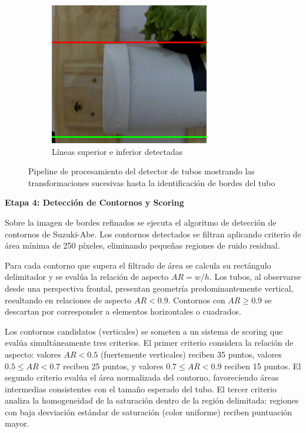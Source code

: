 \begin{figure}[H]
\vspace{0.3cm}

\begin{subfigure}[b]{0.48\textwidth}
    \centering
    \includegraphics[width=\textwidth]{imagenes/detector_tubos_6_lineas.png}
    \caption{Líneas superior e inferior detectadas}
\end{subfigure}

\caption{Pipeline de procesamiento del detector de tubos mostrando las transformaciones sucesivas hasta la identificación de bordes del tubo}
\label{fig:proceso_tubos}
\end{figure}

\textbf{Etapa 4: Detección de Contornos y Scoring}

Sobre la imagen de bordes refinados se ejecuta el algoritmo de detección de contornos de Suzuki-Abe. Los contornos detectados se filtran aplicando criterio de área mínima de 250 píxeles, eliminando pequeñas regiones de ruido residual.

Para cada contorno que supera el filtrado de área se calcula su rectángulo delimitador y se evalúa la relación de aspecto $AR = w/h$. Los tubos, al observarse desde una perspectiva frontal, presentan geometría predominantemente vertical, resultando en relaciones de aspecto $AR < 0.9$. Contornos con $AR \geq 0.9$ se descartan por corresponder a elementos horizontales o cuadrados.

Los contornos candidatos (verticales) se someten a un sistema de scoring que evalúa simultáneamente tres criterios. El primer criterio considera la relación de aspecto: valores $AR < 0.5$ (fuertemente verticales) reciben 35 puntos, valores $0.5 \leq AR < 0.7$ reciben 25 puntos, y valores $0.7 \leq AR < 0.9$ reciben 15 puntos. El segundo criterio evalúa el área normalizada del contorno, favoreciendo áreas intermedias consistentes con el tamaño esperado del tubo. El tercer criterio analiza la homogeneidad de la saturación dentro de la región delimitada: regiones con baja desviación estándar de saturación (color uniforme) reciben puntuación mayor.

